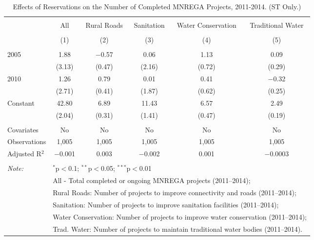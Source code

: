 
\begin{table}[!htbp] \centering 
  \caption{Effects of Reservations on the Number of Completed MNREGA Projects, 2011-2014. (ST Only.)} 
  \label{main_mnrega_phase_st} 
\scriptsize 
\begin{tabular}{@{\extracolsep{5pt}}lccccc} 
\\[-1.8ex]\hline 
\hline \\[-1.8ex] 
 & All & Rural Roads & Sanitation & Water Conservation & Traditional Water \\ 
\\[-1.8ex] & (1) & (2) & (3) & (4) & (5)\\ 
\hline \\[-1.8ex] 
 2005 & 1.88 & $-$0.57 & 0.06 & 1.13 & 0.09 \\ 
  & (3.13) & (0.47) & (2.16) & (0.72) & (0.29) \\ 
  2010 & 1.26 & 0.79 & 0.01 & 0.41 & $-$0.32 \\ 
  & (2.71) & (0.41) & (1.87) & (0.62) & (0.25) \\ 
  Constant & 42.80 & 6.89 & 11.43 & 6.57 & 2.49 \\ 
  & (2.04) & (0.31) & (1.41) & (0.47) & (0.19) \\ 
 \hline \\[-1.8ex] 
Covariates & No & No & No & No & No \\ 
Observations & 1,005 & 1,005 & 1,005 & 1,005 & 1,005 \\ 
Adjusted R$^{2}$ & $-$0.001 & 0.003 & $-$0.002 & 0.001 & $-$0.0003 \\ 
\hline 
\hline \\[-1.8ex] 
\textit{Note:}  & \multicolumn{5}{l}{$^{*}$p$<$0.1; $^{**}$p$<$0.05; $^{***}$p$<$0.01} \\ 
 & \multicolumn{5}{l}{All - Total completed or ongoing MNREGA projects (2011--2014);} \\ 
 & \multicolumn{5}{l}{Rural Roads: Number of projects to improve connectivity and roads (2011--2014);} \\ 
 & \multicolumn{5}{l}{Sanitation:  Number of projects to improve sanitation facilities  (2011--2014);} \\ 
 & \multicolumn{5}{l}{Water Conservation: Number of projects to improve water conservation (2011--2014);} \\ 
 & \multicolumn{5}{l}{Trad. Water: Number of projects to maintain traditional water bodies (2011--2014).} \\ 
\end{tabular} 
\end{table} 
